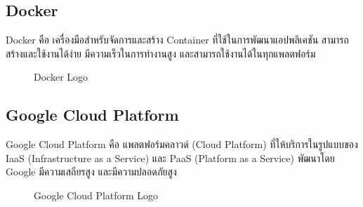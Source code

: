 \subsection{Docker}

Docker คือ เครื่องมือสำหรับจัดการและสร้าง Container ที่ใช้ในการพัฒนาแอปพลิเคชัน สามารถสร้างและใช้งานได้ง่าย มีความเร็วในการทำงานสูง และสามารถใช้งานได้ในทุกแพลตฟอร์ม \cite{WhatIsDocker}

\begin{figure}[H]
    \centering
    \caption{Docker Logo}
    \label{fig:docker}
\end{figure}

\subsection{Google Cloud Platform}

Google Cloud Platform คือ แพลตฟอร์มคลาวด์ (Cloud Platform) ที่ให้บริการในรูปแบบของ IaaS (Infrastructure as a Service) และ PaaS (Platform as a Service) พัฒนาโดย Google มีความเสถียรสูง และมีความปลอดภัยสูง \cite{GCPNewbie}

\begin{figure}[H]
    \centering
    \caption{Google Cloud Platform Logo}
    \label{fig:gcp}
\end{figure}